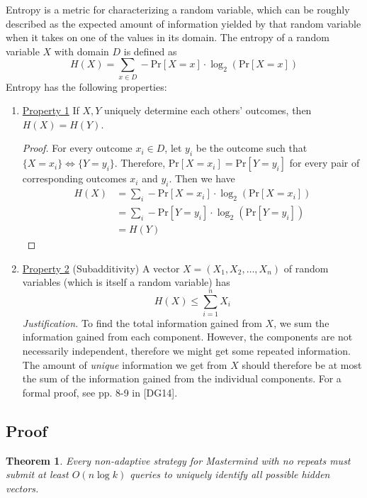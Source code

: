 \documentclass[12pt, a4paper]{article}
\newtheorem{theorem}{Theorem}
\begin{document}
Entropy is a metric for characterizing a random variable, which can be roughly
described as the expected amount of information yielded by that random variable when
it takes on one of the values in its domain. The entropy of a random variable $X$ with
domain $D$ is defined as
	\begin{equation*}
	H(X) = \sum_{x\in D}-\text{Pr}[X=x]\cdot\log_2\left(\text{Pr}[X=x]\right)
	\end{equation*}
Entropy has the following properties:
	\begin{enumerate}[label=]
	\item\underline{Property 1} If $X,Y$ uniquely determine each others'
	outcomes, then $H(X)=H(Y)$.
		\begin{proof}
		For every outcome $x_i\in D$, let $y_i$ be the outcome such that $\{X=x_i\}
		\Leftrightarrow \{Y=y_i\}$. Therefore,
		$\text{Pr}[X=x_i]=\text{Pr}[Y=y_i]$ for every pair of corresponding outcomes
		$x_i$ and $y_i$. Then we have
			\begin{align*}
			H(X) & = \sum_{i}-\text{Pr}[X=x_i]\cdot\log_2(\text{Pr}[X=x_i])\\
			& = \sum_{i}-\text{Pr}[Y=y_i]\cdot\log_2(\text{Pr}[Y=y_i])\\
			& = H(Y)
			\end{align*}
		\end{proof}
		
	\item\underline{Property 2} (Subadditivity) A vector $X=(X_1, X_2, \ldots, X_n)$
	of random variables (which is itself a random variable) has
		\begin{equation*}
		H(X)\le \sum_{i=1}^{n}X_i
		\end{equation*}
	\textit{Justification.} To find the total information gained from $X$, we sum
	the information gained from each component. However, the components are not
	necessarily independent, therefore we might get some repeated information. The
	amount of \textit{unique} information we get from $X$ should therefore be
	at most the sum of the information gained from the individual components. For
	a formal proof, see pp. 8-9 in [DG14].
	\end{enumerate}

\subsection*{Proof}
\begin{theorem}
Every non-adaptive strategy for Mastermind with no repeats must submit at least
$O(n \log k)$ queries to uniquely identify all possible hidden vectors.
\end{theorem}
\end{document}
